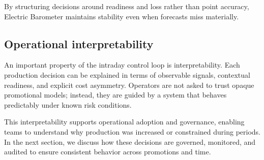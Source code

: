 By structuring decisions around readiness and loss rather than point accuracy, Electric Barometer
maintains stability even when forecasts miss materially.

\subsection{Operational interpretability}
\label{subsec:intraday-interpretability}

An important property of the intraday control loop is interpretability. Each production decision can
be explained in terms of observable signals, contextual readiness, and explicit cost asymmetry.
Operators are not asked to trust opaque promotional models; instead, they are guided by a system
that behaves predictably under known risk conditions.

This interpretability supports operational adoption and governance, enabling teams to understand
why production was increased or constrained during \LTO{} periods. In the next section, we discuss
how these decisions are governed, monitored, and audited to ensure consistent behavior across
promotions and time.
